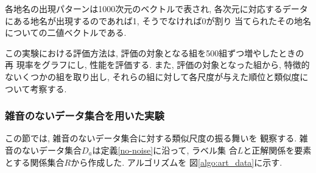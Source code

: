 各地名の出現パターンは1000次元のベクトルで表され, 
各次元に対応するデータにある地名が出現するのであれば1, そうでなければ0が割り
当てられたその地名についての二値ベクトルである. 

この実験における評価方法は, 評価の対象となる組を500組ずつ増やしたときの再
現率をグラフにし, 性能を評価する.
また, 評価の対象となった組から, 特徴的ないくつかの組を取り出し, 
それらの組に対して各尺度が与えた順位と類似度について考察する. 

\subsubsection{雑音のないデータ集合を用いた実験} \label{sec:without}
この節では, 雑音のないデータ集合に対する類似尺度の振る舞いを
観察する. 雑音のないデータ集合$D_a$は定義\ref{no-noise}に沿って, ラベル集
合$L$と正解関係を要素とする関係集合$R$から作成した. アルゴリズムを
図\ref{algo:art_data}に示す. 
